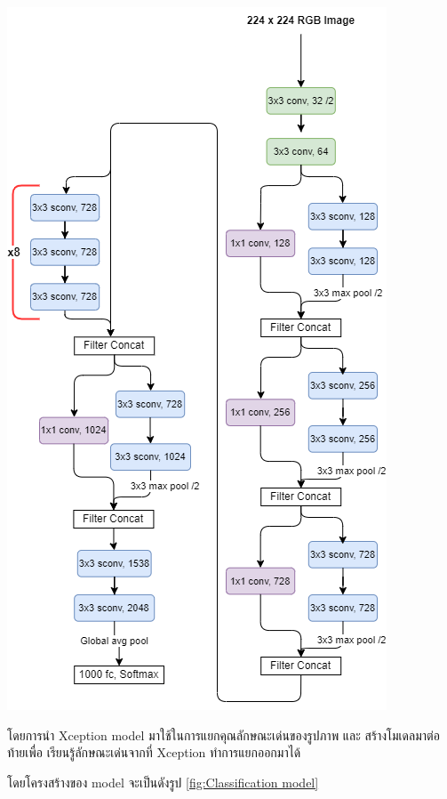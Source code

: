 \begin{center}
  \includegraphics[scale=0.35]{pic/model/x_1.png}\cite{Xception}
\end{center}


โดยการนำ Xception model มาใช้ในการแยกคุณลักษณะเด่นของรูปภาพ  และ สร้างโมเดลมาต่อท้ายเพื่อ
เรียนรู้ลักษณะเด่นจากที่ Xception ทำการแยกออกมาได้

โดยโครงสร้างของ model จะเป็นดังรูป \ref{fig:Classification model}

